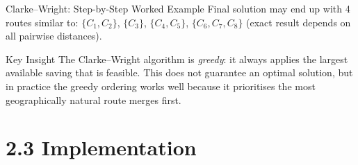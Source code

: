 \documentclass[aspectratio=169,10pt]{beamer}
\begin{document}
\begin{frame}[allowframebreaks]{Clarke--Wright: Step-by-Step Worked Example}
  \medskip
  Final solution may end up with 4 routes similar to: $\{C_1,C_2\}$,
  $\{C_3\}$, $\{C_4,C_5\}$, $\{C_6,C_7,C_8\}$ (exact result depends on
  all pairwise distances).

  \begin{alertblock}{Key Insight}
    The Clarke--Wright algorithm is \emph{greedy}: it always applies the
    largest available saving that is feasible.  This does not guarantee an
    optimal solution, but in practice the greedy ordering works well because
    it prioritises the most geographically natural route merges first.
  \end{alertblock}

\end{frame}

\section{2.3 Implementation}
\end{document}
